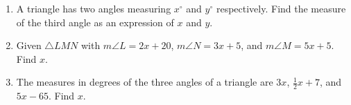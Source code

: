 \begin{enumerate}
\item A triangle has two angles measuring $x^\circ$ and $y^\circ$ respectively. Find the measure of the third angle as an expression of $x$ and $y$. \vspace{2cm}

\newpage
\item Given  $\triangle LMN$ with $m\angle L=2x+20$, $m\angle N=3x+5$, and $m\angle M=5x+5$. Find $x$.
  \begin{flushright}
  \end{flushright} \vspace{2cm}

\item The measures in degrees of the three angles of a triangle are $3x$, $\frac{1}{2}x+7$, and $5x-65$. Find $x$. \vspace{4cm}


\end{enumerate}
